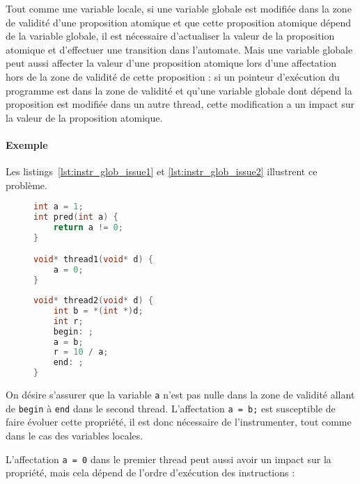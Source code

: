 Tout comme une variable locale, si une variable globale est modifiée
dans la zone de validité d'une proposition atomique et que cette
proposition atomique dépend de la variable globale, il est nécessaire
d'actualiser la valeur de la proposition atomique et d'effectuer une
transition dans l'automate. Mais une variable globale peut aussi
affecter la valeur d'une proposition atomique lors d'une affectation
hors de la zone de validité de cette proposition : si un pointeur
d'exécution du programme est dans la zone de validité et qu'une variable
globale dont dépend la proposition est modifiée dans un autre thread,
cette modification a un impact sur la valeur de la proposition atomique.

\paragraph{Exemple}
Les listings~\ref{lst:instr_glob_issue1} et \ref{lst:instr_glob_issue2}
illustrent ce problème.

\begin{figure}
\noindent\begin{minipage}{.45\textwidth}
\begin{lstlisting}[language=C, frame=single, caption=Thread 1,
  label=lst:instr_glob_issue1]
int a = 1;
int pred(int a) {
    return a != 0;
}

void* thread1(void* d) {
    a = 0;
}
\end{lstlisting}
\end{minipage}\hfill
\begin{minipage}{.45\textwidth}
\begin{lstlisting}[language=C, frame=single, caption=Thread 2,
  label=lst:instr_glob_issue2]
void* thread2(void* d) {
    int b = *(int *)d;
    int r;
    begin: ;
    a = b;
    r = 10 / a;
    end: ;
}
\end{lstlisting}
\end{minipage}
\end{figure}

On désire s'assurer que la variable \texttt{a} n'est pas nulle dans
la zone de validité allant de \texttt{begin} à \texttt{end} dans
le second thread. L'affectation \texttt{a = b;} est susceptible de
faire évoluer cette propriété, il est donc nécessaire de l'instrumenter,
tout comme dans le cas des variables locales.

L'affectation \texttt{a = 0} dans le premier thread peut aussi avoir
un impact sur la propriété, mais cela dépend de l'ordre d'exécution des
instructions :

